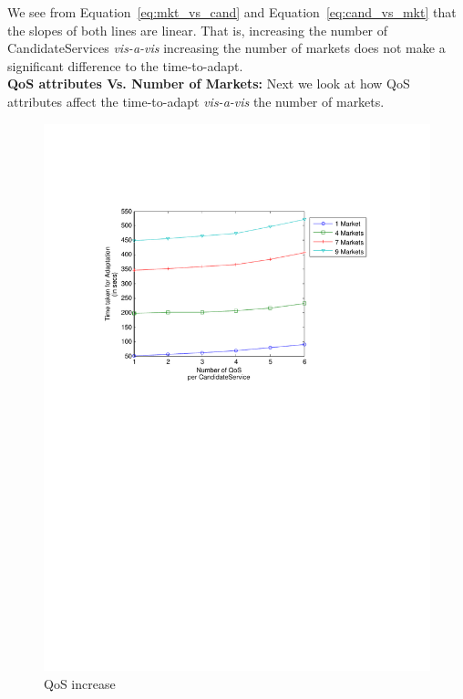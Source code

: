 \documentclass[10pt,journal,compsoc]{IEEEtran}
\begin{document}
We see from Equation~\ref{eq:mkt_vs_cand} and Equation~\ref{eq:cand_vs_mkt} that the slopes of both lines are linear. That is, increasing the number of CandidateServices \textit{vis-a-vis} increasing the number of markets does not make a significant difference to the time-to-adapt.\\

\textbf{QoS attributes Vs. Number of Markets:}
Next we look at how QoS attributes affect the time-to-adapt \textit{vis-a-vis} the number of markets. 

\begin{figure}[htbp]
\centering
  \includegraphics[clip, trim=0cm 16.2cm 2cm 4cm, scale=0.45]{graphs/1_4_7_9_mkts_per_qos.pdf}
  \caption{QoS increase\label{fig:mkt_per_qos}}		
\end{figure}
\end{document}
